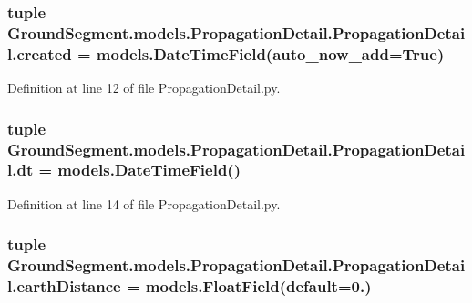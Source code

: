 \subsubsection[{created}]{\setlength{\rightskip}{0pt plus 5cm}tuple Ground\+Segment.\+models.\+Propagation\+Detail.\+Propagation\+Detail.\+created = models.\+Date\+Time\+Field(auto\+\_\+now\+\_\+add=True)\hspace{0.3cm}{\ttfamily [static]}}\label{class_ground_segment_1_1models_1_1_propagation_detail_1_1_propagation_detail_ad7e2ec78c0134fd9d718e09b68d4bbfc}


Definition at line 12 of file Propagation\+Detail.\+py.

\hypertarget{class_ground_segment_1_1models_1_1_propagation_detail_1_1_propagation_detail_aa2fb4a49e9ee276473bf1f382ce44cf7}{}
\subsubsection[{dt}]{\setlength{\rightskip}{0pt plus 5cm}tuple Ground\+Segment.\+models.\+Propagation\+Detail.\+Propagation\+Detail.\+dt = models.\+Date\+Time\+Field()\hspace{0.3cm}{\ttfamily [static]}}\label{class_ground_segment_1_1models_1_1_propagation_detail_1_1_propagation_detail_aa2fb4a49e9ee276473bf1f382ce44cf7}


Definition at line 14 of file Propagation\+Detail.\+py.

\hypertarget{class_ground_segment_1_1models_1_1_propagation_detail_1_1_propagation_detail_a98f9ff07f0d54a2b315b4ad247c9c4eb}{}
\subsubsection[{earth\+Distance}]{\setlength{\rightskip}{0pt plus 5cm}tuple Ground\+Segment.\+models.\+Propagation\+Detail.\+Propagation\+Detail.\+earth\+Distance = models.\+Float\+Field(default=0.)\hspace{0.3cm}{\ttfamily [static]}}\label{class_ground_segment_1_1models_1_1_propagation_detail_1_1_propagation_detail_a98f9ff07f0d54a2b315b4ad247c9c4eb}


